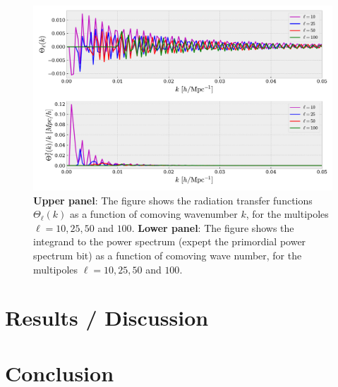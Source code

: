 \documentclass[twocolumn]{aastex62}
\begin{document}
\begin{figure}
    \includegraphics[scale = 0.65]{Figures/Transfer_func.pdf}
    \caption{\textbf{Upper panel}: The figure shows the radiation transfer functions $\Theta_\ell(k)$ as a function of comoving wavenumber $k$, for the multipoles $\ell = 10, 25, 50$ and $100$. \textbf{Lower panel}: The figure shows the integrand to the power spectrum (expept the primordial power spectrum bit) as a function of comoving wave number, for the multipoles $\ell = 10, 25, 50$ and $100$.}
    \label{fig:Transfer_func}
\end{figure}

\section{Results / Discussion}\label{sec:Results/Discussion}

\section{Conclusion} \label{sec:Conclusion}

\newpage


\end{document}
